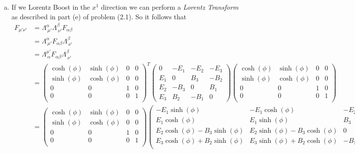 \documentclass[11pt]{article}
\numberwithin{equation}{section}
\begin{document}
\begin{enumerate}[(a)]
\item
If we Lorentz Boost in the $x^1$ direction we can perform a \emph{Lorentz Transform} as described in part (e) of problem (2.1). So it follows that
\begin{align*}
F_{\mu'\nu'} &= \Lambda^{\alpha}_{\ \mu'}\Lambda^{\beta}_{\ \nu'}F_{\alpha \beta}\\
&= \Lambda^{\alpha}_{\ \mu'}F_{\alpha \beta}\Lambda^{\beta}_{\ \nu'}\\
&= \Lambda^{\mu'}_{\ \alpha}F_{\alpha \beta}\Lambda^{\beta}_{\ \nu'}\\
&= \left(\begin{array}{cccc}
	\cosh(\phi) &\sinh(\phi) &0 &0\\
	\sinh(\phi) &\cosh(\phi) &0 &0\\
	0 &0 &1 &0\\
	0 &0 &0 &1\\
		\end{array}\right)^T
		\left(\begin{array}{cccc}
		0 &-E_1 &-E_2 &-E_3\\
		E_1 &0 &B_3 &-B_2\\
		E_2 &-B_3 &0 &B_1\\
		E_3 &B_2 &-B_1 &0
		\end{array}\right)
		\left(\begin{array}{cccc}
	\cosh(\phi) &\sinh(\phi) &0 &0\\
	\sinh(\phi) &\cosh(\phi) &0 &0\\
	0 &0 &1 &0\\
	0 &0 &0 &1\\
		\end{array}\right)\\
&=		\left(\begin{array}{cccc}
	\cosh(\phi) &\sinh(\phi) &0 &0\\
	\sinh(\phi) &\cosh(\phi) &0 &0\\
	0 &0 &1 &0\\
	0 &0 &0 &1\\
		\end{array}\right)
		\left(\begin{array}{cccc}
		-E_1\sinh(\phi)	&-E_1\cosh(\phi)	&-E_2	&-E_3\\
		E_1\cosh(\phi)	&E_1\sinh(\phi)		&B_3	&-B_2\\
		E_2\cosh(\phi) - B_3\sinh(\phi)	&E_2\sinh(\phi)-B_3\cosh(\phi)		&0	&B_1\\
		E_3\cosh(\phi) + B_2\sinh(\phi)	&E_3\sinh(\phi)+B_2\cosh(\phi)		&-B_1	&0\\

\end{array}
\end{align*}
\end{enumerate}
\end{document}
